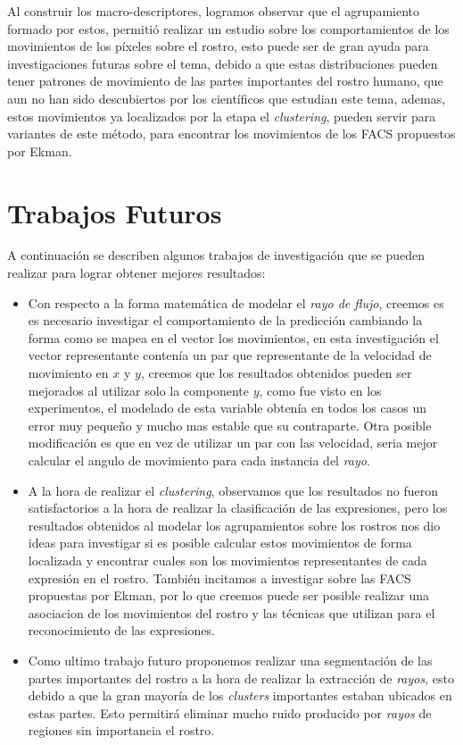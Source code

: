 Al construir los macro-descriptores, logramos observar que el agrupamiento formado por estos, permitió realizar un estudio sobre los comportamientos de los movimientos de los píxeles sobre el rostro, esto puede ser de gran ayuda para investigaciones futuras sobre el tema, debido a que estas distribuciones pueden tener patrones de movimiento de las partes importantes del rostro humano, que aun no han sido descubiertos por los científicos que estudian este tema, ademas, estos movimientos ya localizados por la etapa el \textit{clustering}, pueden servir para variantes de este método, para encontrar los movimientos de los FACS propuestos por Ekman.

\section{Trabajos Futuros}

A continuación se describen algunos trabajos de investigación que se pueden realizar para lograr obtener mejores resultados:

\begin{itemize}
	
	\item Con respecto a la forma matemática de modelar el \textit{rayo de flujo}, creemos es es necesario investigar el comportamiento de la predicción cambiando la forma como se mapea en el vector los movimientos, en esta investigación el vector representante contenía un par que representante de la velocidad de movimiento en $x$ y $y$, creemos que los resultados obtenidos pueden ser mejorados al utilizar solo la componente $y$, como fue visto en los experimentos, el modelado de esta variable obtenía en todos los casos un error muy pequeño y mucho mas estable que su contraparte. Otra posible modificación es que en vez de utilizar un par con las velocidad, seria mejor calcular el angulo de movimiento para cada instancia del \textit{rayo}.
	
	\item A la hora de realizar el \textit{clustering}, observamos que los resultados no fueron satisfactorios a la hora de realizar la clasificación de las expresiones, pero los resultados obtenidos al modelar los agrupamientos sobre los rostros nos dio ideas para investigar si es posible calcular estos movimientos de forma localizada y encontrar cuales son los movimientos representantes de cada expresión en el rostro. También incitamos a investigar sobre las FACS propuestas por Ekman, por lo que creemos puede ser posible realizar una asociacion de los movimientos del rostro y las técnicas que utilizan para el reconocimiento de las expresiones.
	
	\item Como ultimo trabajo futuro proponemos realizar una segmentación de las partes importantes del rostro a la hora de realizar la extracción de \textit{rayos}, esto debido a que la gran mayoría de los \textit{clusters} importantes estaban ubicados en estas partes. Esto permitirá eliminar mucho ruido producido por \textit{rayos} de regiones sin importancia el rostro.
	
\end{itemize}